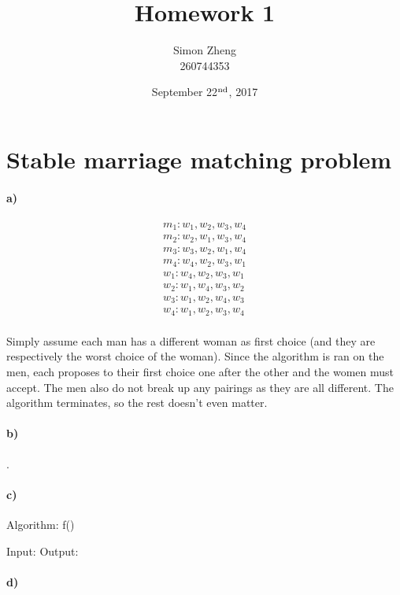 \documentclass[11pt,letterpaper]{article}
\author{Simon Zheng\\260744353}
\title{Homework 1}
\date{September 22$^{\textnormal{nd}}$, 2017}
\begin{document}
	\maketitle
	\thispagestyle{fancy}
	
	\section{Stable marriage matching problem}
	
		\paragraph{a)}
		\begin{align*}
		m_1 : w_1 , w_2 , w_3 , w_4 \\
		m_2 : w_2 , w_1 , w_3 , w_4 \\
		m_3 : w_3 , w_2 , w_1 , w_4 \\
		m_4 : w_4 , w_2 , w_3 , w_1 \\
		w_1 : w_4 , w_2 , w_3 , w_1 \\
		w_2 : w_1 , w_4 , w_3 , w_2 \\
		w_3 : w_1 , w_2 , w_4 , w_3 \\
		w_4 : w_1 , w_2 , w_3 , w_4 \\
		\end{align*}
    
    Simply assume each man has a different woman as first choice (and they are respectively the worst choice of the woman). Since the algorithm is ran on the men, each proposes to their first choice one after the other and the women must accept. The men also do not break up any pairings as they are all different. The algorithm terminates, so the rest doesn't even matter.
		
		\paragraph{b)}
		.
		
		\paragraph{c)}
		\begin{center}
		Algorithm: f()
		\end{center}
		\begin{algorithm}[caption={}, label={alg2}]
Input: 
Output: 


		\end{algorithm}
		
		\paragraph{d)}
		
\end{document}
